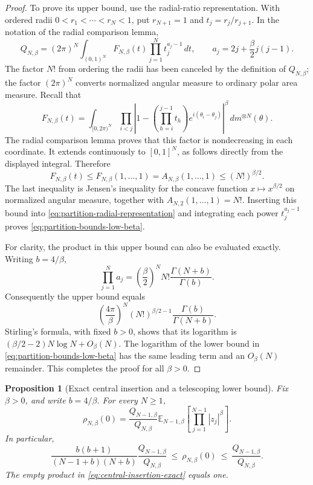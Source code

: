 \documentclass[11pt,a4paper]{article}
\numberwithin{equation}{section}
\newtheorem{proposition}[theorem]{Proposition}
\theoremstyle{definition}
\theoremstyle{remark}
\begin{document}
\begin{proof}
To prove its upper bound, use the radial-ratio representation.  With
ordered radii $0<r_1<\cdots<r_N<1$, put $r_{N+1}=1$ and
$t_j=r_j/r_{j+1}$.  In the notation of the radial comparison lemma,
\begin{equation}
 Q_{N,\beta}
 =(2\pi)^N\int_{(0,1)^N}
 F_{N,\beta}(t)\prod_{j=1}^N t_j^{a_j-1}\,dt,
 \qquad a_j=2j+\frac\beta2j(j-1).
 \label{eq:partition-radial-representation}
\end{equation}
The factor $N!$ from ordering the radii has been canceled by the definition
of $Q_{N,\beta}$; the factor $(2\pi)^N$ converts normalized angular
measure to ordinary polar area measure.  Recall that
\[
 F_{N,\beta}(t)
 =\int_{[0,2\pi)^N}
 \prod_{i<j}\left|
 1-\left(\prod_{h=i}^{j-1}t_h\right)e^{i(\theta_i-\theta_j)}
 \right|^\beta\,dm^{\otimes N}(\theta).
\]
The radial comparison lemma proves that this factor is nondecreasing in
each coordinate.  It extends continuously to $[0,1]^N$, as follows
directly from the displayed integral.  Therefore
\[
 F_{N,\beta}(t)\leq F_{N,\beta}(1,\ldots,1)
 =A_{N,\beta}(1,\ldots,1)
 \leq (N!)^{\beta/2}.
\]
The last inequality is Jensen's inequality for the concave function
$x\mapsto x^{\beta/2}$ on normalized angular measure, together with
$A_{N,2}(1,\ldots,1)=N!$.  Inserting this bound into
\eqref{eq:partition-radial-representation} and integrating each power
$t_j^{a_j-1}$ proves \eqref{eq:partition-bounds-low-beta}.

For clarity, the product in this upper bound can also be evaluated exactly.
Writing $b=4/\beta$,
\[
 \prod_{j=1}^N a_j
 =\left(\frac\beta2\right)^N N!
       \frac{\Gamma(N+b)}{\Gamma(b)}.
\]
Consequently the upper bound equals
\[
 \left(\frac{4\pi}{\beta}\right)^N
       (N!)^{\beta/2-1}\frac{\Gamma(b)}{\Gamma(N+b)}.
\]
Stirling's formula, with fixed $b>0$, shows that its logarithm is
$(\beta/2-2)N\log N+O_\beta(N)$.  The logarithm of the lower bound
in \eqref{eq:partition-bounds-low-beta} has the same leading term and
an $O_\beta(N)$ remainder.  This completes the proof for all $\beta>0$.
\end{proof}

\begin{proposition}[Exact central insertion and a telescoping lower bound]
\label{prop:central-insertion}
Fix $\beta>0$, and write $b=4/\beta$.  For every $N\geq1$,
\begin{equation}
 \rho_{N,\beta}(0)
 =\frac{Q_{N-1,\beta}}{Q_{N,\beta}}
   \mathbb E_{N-1,\beta}
     \left[\prod_{j=1}^{N-1}|z_j|^\beta\right].
 \label{eq:central-insertion-exact}
\end{equation}
In particular,
\begin{equation}
 \frac{b(b+1)}{(N-1+b)(N+b)}
       \frac{Q_{N-1,\beta}}{Q_{N,\beta}}
 \ \leq\ \rho_{N,\beta}(0)
 \ \leq\ \frac{Q_{N-1,\beta}}{Q_{N,\beta}}.
 \label{eq:central-insertion-bounds}
\end{equation}
The empty product in \eqref{eq:central-insertion-exact} equals one.
\end{proposition}
\end{document}
